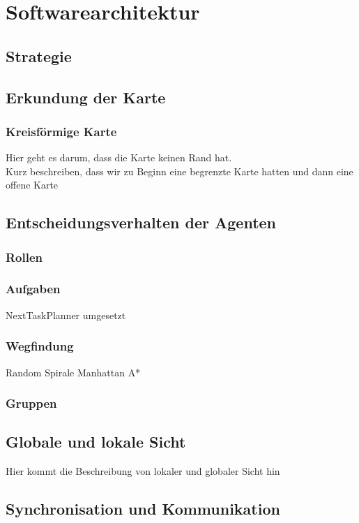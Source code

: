 \section{Softwarearchitektur}

\subsection{Strategie}


\subsection{Erkundung der Karte}

\subsubsection{Kreisförmige Karte}

Hier geht es darum, dass die Karte keinen Rand hat. \\
Kurz beschreiben, dass wir zu Beginn eine begrenzte Karte hatten und dann eine offene Karte

\subsection{Entscheidungsverhalten der Agenten}

\subsubsection{Rollen}


\subsubsection{Aufgaben}
NextTaskPlanner umgesetzt

\subsubsection{Wegfindung}
Random \newline
Spirale \newline
Manhattan \newline
A*

\subsubsection{Gruppen}

\subsection{Globale und lokale Sicht}

Hier kommt die Beschreibung von lokaler und globaler Sicht hin

\subsection{Synchronisation und Kommunikation}
